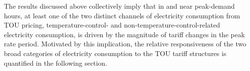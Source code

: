 The results discussed above collectively imply that in and near peak-demand hours, at least one of the two distinct channels of electricity consumption from TOU pricing, temperature-control- and non-temperature-control-related electricity consumption, is driven by the magnitude of tariff changes in the peak rate period. Motivated by this implication, the relative responsiveness of the two broad categories of electricity consumption to the TOU tariff structures is quantified in the following section.  
